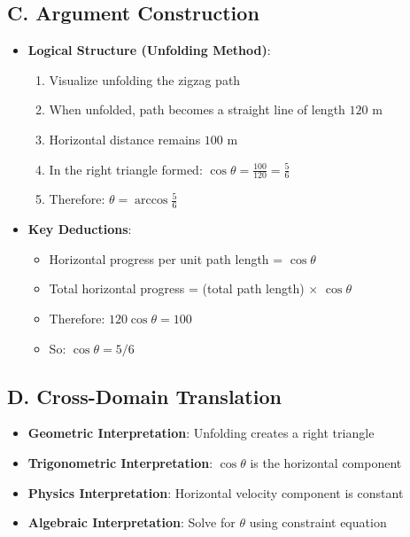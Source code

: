 \documentclass[11pt]{article}
\begin{document}
\begin{strategybox}
\subsection*{C. Argument Construction}
\begin{itemize}[leftmargin=*]
    \item \textbf{Logical Structure (Unfolding Method)}:
    \begin{enumerate}
        \item Visualize unfolding the zigzag path
        \item When unfolded, path becomes a straight line of length $120$ m
        \item Horizontal distance remains $100$ m
        \item In the right triangle formed: $\cos\theta = \frac{100}{120} = \frac{5}{6}$
        \item Therefore: $\theta = \arccos\frac{5}{6}$
    \end{enumerate}
    \item \textbf{Key Deductions}:
    \begin{itemize}
        \item Horizontal progress per unit path length = $\cos\theta$
        \item Total horizontal progress = (total path length) $\times$ $\cos\theta$
        \item Therefore: $120 \cos\theta = 100$
        \item So: $\cos\theta = 5/6$
    \end{itemize}
\end{itemize}

\subsection*{D. Cross-Domain Translation}
\begin{itemize}[leftmargin=*]
    \item \textbf{Geometric Interpretation}: Unfolding creates a right triangle
    \item \textbf{Trigonometric Interpretation}: $\cos\theta$ is the horizontal component
    \item \textbf{Physics Interpretation}: Horizontal velocity component is constant
    \item \textbf{Algebraic Interpretation}: Solve for $\theta$ using constraint equation
\end{itemize}
\end{strategybox}
\end{document}
